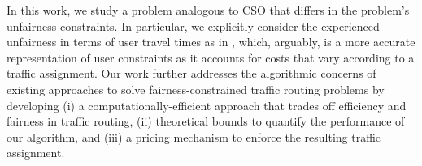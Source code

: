 \documentclass{article}
\newif\ifarxiv   %
\begin{document}
In this work, we study a problem analogous to CSO that differs in the problem's unfairness constraints. In particular, we explicitly consider the experienced unfairness in terms of user travel times as in \cite{ANGELELLI2020105016}, which, arguably, is a more accurate representation of user constraints as it accounts for costs that vary according to a traffic assignment. Our work further addresses the algorithmic concerns of existing approaches to solve fairness-constrained traffic routing problems by developing (i) a computationally-efficient approach that trades off efficiency and fairness in traffic routing, (ii) theoretical bounds to quantify the performance of our algorithm, and (iii) a pricing mechanism to enforce the resulting traffic assignment.

\begin{comment}
\ifarxiv In this work, we study a problem analogous to CSO that differs in the problem's unfairness constraints. In particular, we explicitly consider the experienced unfairness in terms of user travel times as in \cite{ANGELELLI2020105016}, which, arguably, is a more accurate representation of user constraints as it accounts for user costs that vary according to a traffic assignment. We further address the aforementioned algorithmic concerns by developing (i) a computationally-efficient approach that trades off efficiency and fairness in traffic routing, (ii) theoretical bounds to quantify the performance of our algorithm and (iii) a pricing mechanism to enforce the resulting traffic assignment.
\else 
In this work, we study a problem analogous to CSO that differs in the unfairness constraints, and address the aforementioned concerns by developing (i) a computationally-efficient approach that trades off efficiency and fairness in traffic routing, (ii) theoretical bounds to quantify the performance of our algorithm, and (iii) a pricing mechanism to enforce the resulting traffic assignment.
\fi
\end{comment}

\end{document}
